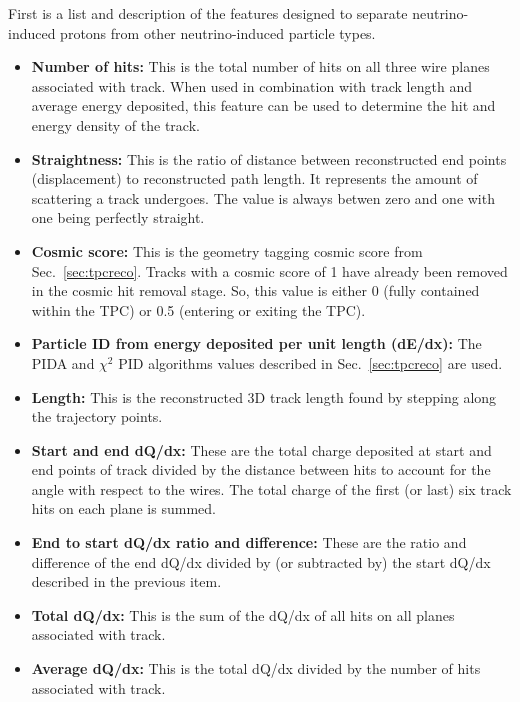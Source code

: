     First is a list and description of the features designed to separate
    neutrino-induced protons from other neutrino-induced particle types.
    \begin{itemize}
      \item \textbf{Number of hits:} This is the total number of hits on all
      three wire planes associated with track. When used in combination with
      track length and average energy deposited, this feature can be used to
      determine the hit and energy density of the track.
      \item \textbf{Straightness:} This is the ratio of distance between
      reconstructed end points (displacement) to reconstructed path length. It
      represents the amount of scattering a track undergoes. The value is
      always betwen zero and one with one being perfectly straight.
      \item \textbf{Cosmic score:} This is the geometry tagging cosmic score
      from Sec.~\ref{sec:tpcreco}. Tracks with a cosmic score of 1 have already
      been removed in the cosmic hit removal stage. So, this value is either 0
      (fully contained within the TPC) or 0.5 (entering or exiting the TPC).
      \item \textbf{Particle ID from energy deposited per unit length (dE/dx):}
      The PIDA and $\chi^2$ PID algorithms values described in
      Sec.~\ref{sec:tpcreco} are used.
      \item \textbf{Length:} This is the reconstructed 3D track length found by
      stepping along the trajectory points.
      \item \textbf{Start and end dQ/dx:} These are the total charge deposited
      at start and end points of track divided by the distance between hits to
      account for the angle with respect to the wires. The total charge of the
      first (or last) six track hits on each plane is summed.
      \item \textbf{End to start dQ/dx ratio and difference:} These are the
      ratio and difference of the end dQ/dx divided by (or subtracted by) the
      start dQ/dx described in the previous item.
      \item \textbf{Total dQ/dx:} This is the sum of the dQ/dx of all hits on
      all planes associated with track.
      \item \textbf{Average dQ/dx:} This is the total dQ/dx divided by the
      number of hits associated with track.
    \end{itemize}


